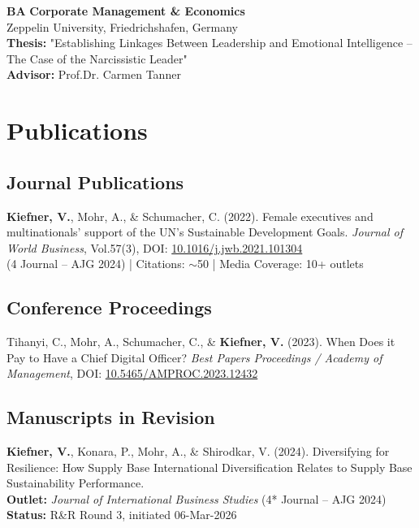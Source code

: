 \documentclass[11pt,a4paper]{article}
\begin{document}
\begin{cv}
\begin{cvlist}{}
  \item[03/2013--03/2017] 
      \textbf{BA} {{\textbf{Corporate Management \& Economics}}}\\
      Zeppelin University, Friedrichshafen, Germany\\
      \textbf{Thesis:} "Establishing Linkages Between Leadership and Emotional Intelligence – The Case of the Narcissistic Leader"\\
      \textbf{Advisor:} {Prof.Dr. Carmen Tanner}
  \end{cvlist}
  
\section{Publications}

\subsection{Journal Publications}
\begin{cvlist}{}
    \item[2022]
      \textbf{Kiefner, V.}, Mohr, A., \& Schumacher, C. (2022). 
      Female executives and multinationals' support of the UN's Sustainable Development Goals. 
      \textit{Journal of World Business}, Vol.{57}(3), DOI: \href{https://www.sciencedirect.com/science/article/pii/S1090951621001152}{10.1016/j.jwb.2021.101304}\\ 
      (4 Journal – AJG 2024) | Citations: $\sim$50 | Media Coverage: 10+ outlets
\end{cvlist}

\subsection{Conference Proceedings}
\begin{cvlist}{}
    \item[2023]
      Tihanyi, C., Mohr, A., Schumacher, C., \& \textbf{Kiefner, V.} (2023). 
      When Does it Pay to Have a Chief Digital Officer? 
      \textit{Best Papers Proceedings / Academy of Management}, DOI: \href{https://journals.aom.org/doi/abs/10.5465/AMPROC.2023.12432abstract}{10.5465/AMPROC.2023.12432}\\ 
\end{cvlist}

\subsection{Manuscripts in Revision}
\begin{cvlist}{}
    \item[2026]
      \textbf{Kiefner, V.}, Konara, P., Mohr, A., \& Shirodkar, V. (2024). 
      Diversifying for Resilience: How Supply Base International Diversification Relates to Supply Base Sustainability Performance.\\
      \textbf{Outlet:} \textit{Journal of International Business Studies} (4* Journal – AJG 2024) \\
      \textbf{Status:} R\&R Round 3, initiated 06-Mar-2026


\end{cvlist}
\end{cv}
\end{document}
